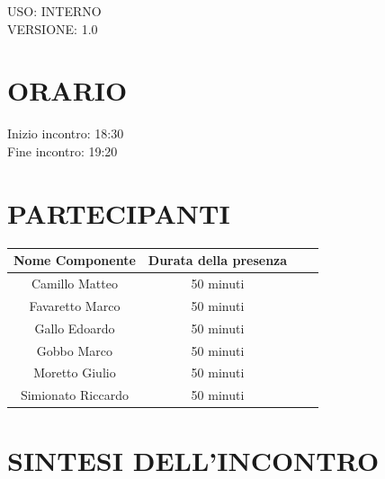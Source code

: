 \documentclass[5pt]{article}
\begin{document}
\begin{flushright}
    \begin{spacing}{1}
        USO: INTERNO\\
        VERSIONE: 1.0\\ %
    \end{spacing}
\end{flushright}


\restoregeometry

\pagebreak


\section{\Large ORARIO}
\begin{spacing}{1.5}
    {\large Inizio incontro: 18:30}\\
    {\large Fine incontro: 19:20}
\end{spacing}

\section{PARTECIPANTI}
\setlength\cellspacetoplimit{6pt}
\setlength\cellspacebottomlimit{6pt}

\begin{table}[ht]
  \begin{tabular}{|Sc|Sc|}
    \hline
    \textbf{Nome Componente} & \textbf{Durata della presenza} \\
    \hline
    Camillo Matteo & 50 minuti \\
    Favaretto Marco &50 minuti\\
    Gallo Edoardo & 50 minuti \\
    Gobbo Marco & 50 minuti \\
    Moretto Giulio & 50 minuti \\
    Simionato Riccardo & 50 minuti \\
    \hline
  \end{tabular}
  \label{tab:conference}
\end{table}

\section{SINTESI DELL'INCONTRO}
\end{document}
